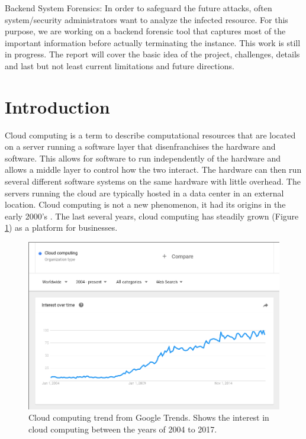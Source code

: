 \documentclass[12pt]{article}
\begin{document}
Backend System Forensics: In order to safeguard the future attacks, often system/security administrators want to analyze the infected resource. For this purpose, we are working on a backend forensic tool that captures most of the important information before actually terminating the instance. This work is still in progress. The report will cover the basic idea of the project, challenges, details and last but not least current limitations and future directions.

\section{Introduction}
Cloud computing is a term to describe computational resources that are located on a server running a software layer that disenfranchises the hardware and software. This allows for software to run independently of the hardware and allows a middle layer to control how the two interact. The hardware can then run several different software systems on the same hardware with little overhead. The servers running the cloud are typically hosted in a data center in an external location.  Cloud computing is not a new phenomenon\cite{rochwerger2009reservoir}, it had its origins in the early 2000's \cite{rochwerger2009reservoir}. The last several years, cloud computing has steadily grown (Figure \ref{fig:CloudTrendGoogle}) as a platform for businesses.

\begin{figure}[ht]
    \centering
    \includegraphics[scale=.3]{./pic/2017-06-14-130823_923x615_scrot.png}
    \caption{Cloud computing trend from Google Trends. Shows the interest in cloud computing between the years of 2004 to 2017. \cite{GoogleTrendsCloud}}
    \label{fig:CloudTrendGoogle}
\end{figure}
\end{document}

